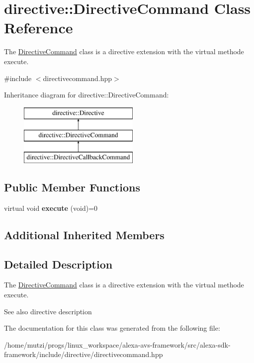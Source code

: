 \hypertarget{classdirective_1_1DirectiveCommand}{}\section{directive\+:\+:Directive\+Command Class Reference}
\label{classdirective_1_1DirectiveCommand}


The \hyperlink{classdirective_1_1DirectiveCommand}{Directive\+Command} class is a directive extension with the virtual methode execute.  




{\ttfamily \#include $<$directivecommand.\+hpp$>$}

Inheritance diagram for directive\+:\+:Directive\+Command\+:\begin{figure}[H]
\begin{center}
\leavevmode
\includegraphics[height=3.000000cm]{da/d20/classdirective_1_1DirectiveCommand}
\end{center}
\end{figure}
\subsection*{Public Member Functions}
\begin{DoxyCompactItemize}
\item 
\mbox{\label{classdirective_1_1DirectiveCommand_a1d41ece7175211a537a45a43a1bde883}} 
virtual void {\bfseries execute} (void)=0
\end{DoxyCompactItemize}
\subsection*{Additional Inherited Members}


\subsection{Detailed Description}
The \hyperlink{classdirective_1_1DirectiveCommand}{Directive\+Command} class is a directive extension with the virtual methode execute. 

\begin{DoxySeeAlso}{See also}
directive description 
\end{DoxySeeAlso}


The documentation for this class was generated from the following file\+:\begin{DoxyCompactItemize}
\item 
/home/mutzi/progs/linux\+\_\+workspace/alexa-\/avs-\/framework/src/alexa-\/sdk-\/framework/include/directive/directivecommand.\+hpp\end{DoxyCompactItemize}
